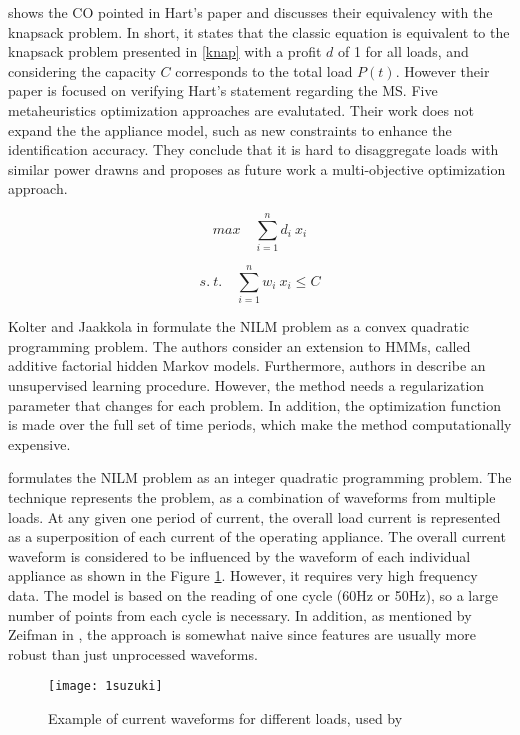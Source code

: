 \cite{meta} shows the CO pointed in Hart's paper and discusses their equivalency with the knapsack problem. In short, it states that the classic equation is equivalent to the knapsack problem presented in \ref{knap} with a profit $d$ of 1 for all loads, and considering the capacity $C$ corresponds to the total load $P(t)$. However their paper is focused on verifying Hart’s statement regarding the MS. Five metaheuristics optimization approaches are evalutated. Their work does not expand the the appliance model, such as new constraints to enhance the identification accuracy. They conclude that it is hard to disaggregate loads with similar power drawns and proposes as future work a multi-objective optimization approach.

\begin{equation} \label{knap}
   max \quad \sum_{i=1}^{n} d_i \ x_i
\end{equation}

$$ s. \ t. \quad \sum_{i=1}^{n} w_i \ x_i \leq C $$

Kolter and Jaakkola in \cite{afhmm} formulate the NILM problem as a convex quadratic programming problem. The authors consider an extension to HMMs, called additive factorial hidden Markov models. Furthermore, authors in \cite{afhmm} describe an unsupervised learning procedure. However, the method needs a regularization parameter that changes for each problem. In addition, the optimization function is made over the full set of time periods, which make the method computationally expensive.

\cite{suzuki} formulates the NILM problem as an integer quadratic programming problem. The technique represents the problem, as a combination of waveforms from multiple loads. 
At any given one period of current, the overall load current is represented as a superposition of each current of the operating appliance. The overall current waveform is considered to be influenced by the waveform of each individual appliance as shown in the Figure \ref{1suzuki}. However, it requires very high frequency data. The model is based on the reading of one cycle (60Hz or 50Hz), so a large number of points from each cycle is necessary. In addition, as mentioned by Zeifman in \cite{zeifman}, the approach is somewhat naive since features are usually more robust than just unprocessed waveforms.


\begin{figure}
    \centering
    \texttt{[image: 1suzuki]}
    \caption{Example of current waveforms for different loads, used by \cite{suzuki}}
    \label{1suzuki}
\end{figure}


